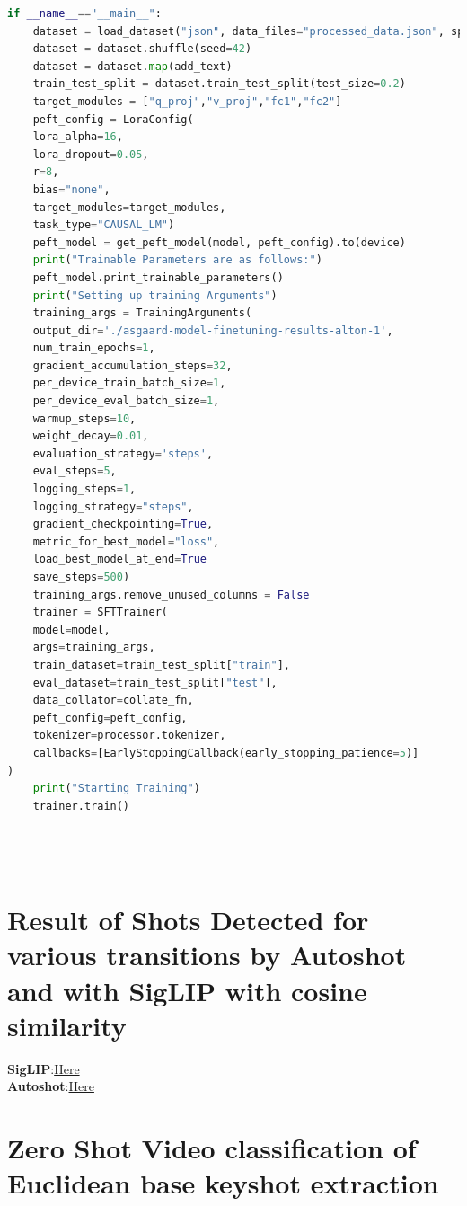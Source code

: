 \documentclass[12pt]{report}
\begin{document}
\begin{lstlisting}[language=Python,caption={LLaVA QLORA finetuning code}]
if __name__=="__main__":
    dataset = load_dataset("json", data_files="processed_data.json", split="train")
    dataset = dataset.shuffle(seed=42)
    dataset = dataset.map(add_text)
    train_test_split = dataset.train_test_split(test_size=0.2)
    target_modules = ["q_proj","v_proj","fc1","fc2"]
    peft_config = LoraConfig(
    lora_alpha=16,
    lora_dropout=0.05,
    r=8,
    bias="none",
    target_modules=target_modules,
    task_type="CAUSAL_LM")
    peft_model = get_peft_model(model, peft_config).to(device)
    print("Trainable Parameters are as follows:")
    peft_model.print_trainable_parameters()
    print("Setting up training Arguments")
    training_args = TrainingArguments(
    output_dir='./asgaard-model-finetuning-results-alton-1',
    num_train_epochs=1,
    gradient_accumulation_steps=32,
    per_device_train_batch_size=1,
    per_device_eval_batch_size=1,
    warmup_steps=10,
    weight_decay=0.01,
    evaluation_strategy='steps',
    eval_steps=5, 
    logging_steps=1,
    logging_strategy="steps",
    gradient_checkpointing=True,
    metric_for_best_model="loss",
    load_best_model_at_end=True    
    save_steps=500)
    training_args.remove_unused_columns = False
    trainer = SFTTrainer(
    model=model,
    args=training_args,
    train_dataset=train_test_split["train"],
    eval_dataset=train_test_split["test"],
    data_collator=collate_fn,
    peft_config=peft_config,
    tokenizer=processor.tokenizer,
    callbacks=[EarlyStoppingCallback(early_stopping_patience=5)]
)
    print("Starting Training")
    trainer.train()
    
    



	\end{lstlisting}
	\chapter{Result of Shots Detected for various transitions by Autoshot and with SigLIP  with cosine similarity}\label{app:shot_detection_results}
	
	\textbf{SigLIP}:\href{https://drive.google.com/file/d/1JWXQnxgmw-eDR61mor8Nbts8EhPeubMJ/view?usp=drive_link}{Here}\\
	\textbf{Autoshot}:\href{https://drive.google.com/file/d/1Cy8ftORc2lAxu_j6hFcMk4qS8Fvtfrlj/view?usp=drive_link}{Here}
	
	\chapter{Zero Shot Video classification of Euclidean base keyshot extraction}\label{app:zero_shot_euclidean_classification}
	
\end{document}
